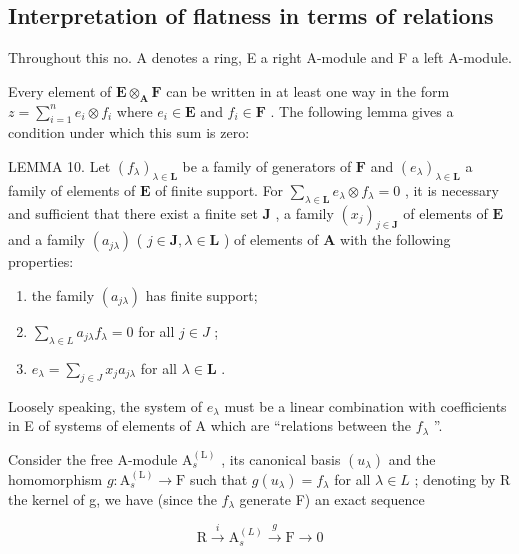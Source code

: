 \subsection{Interpretation of flatness in terms of relations}

Throughout this no. A denotes a ring, E a right A-module and F a left A-module.

Every element of \(\mathbf{E} \otimes_{\mathbf{A}} \mathbf{F}\) can be written in at least one way in the form \(z = \sum_{i=1}^{n} e_i \otimes f_i\) where \(e_i \in \mathbf{E}\) and \(f_i \in \mathbf{F}\) . The following lemma gives a condition under which this sum is zero:

LEMMA 10. Let \((f_{\lambda})_{\lambda \in \mathbf{L}}\) be a family of generators of \(\mathbf{F}\) and \((e_{\lambda})_{\lambda \in \mathbf{L}}\) a family of elements of \(\mathbf{E}\) of finite support. For \(\sum_{\lambda \in \mathbf{L}} e_{\lambda} \otimes f_{\lambda} = 0\) , it is necessary and sufficient that there exist a finite set \(\mathbf{J}\) , a family \((x_{j})_{j \in \mathbf{J}}\) of elements of \(\mathbf{E}\) and a family \((a_{j\lambda})\) ( \(j \in \mathbf{J}, \lambda \in \mathbf{L}\) ) of elements of \(\mathbf{A}\) with the following properties:

\begin{enumerate}
\def\labelenumi{(\arabic{enumi})}
\item
  the family \((a_{j\lambda})\) has finite support;
\item
  \(\sum_{\lambda \in L} a_{j\lambda} f_{\lambda} = 0\) for all \(j \in J\) ;
\item
  \(e_{\lambda} = \sum_{j\in J}x_ja_{j\lambda}\) for all \(\lambda \in \mathbf{L}\) .
\end{enumerate}

Loosely speaking, the system of \(e_{\lambda}\) must be a linear combination with coefficients in E of systems of elements of A which are ``relations between the \(f_{\lambda}\) ''.

Consider the free A-module \(\mathrm{A}_{s}^{(\mathrm{L})}\) , its canonical basis \((u_{\lambda})\) and the homomorphism \(g: \mathrm{A}_{s}^{(\mathrm{L})} \to \mathrm{F}\) such that \(g(u_{\lambda}) = f_{\lambda}\) for all \(\lambda \in L\) ; denoting by R the kernel of g, we have (since the \(f_{\lambda}\) generate F) an exact sequence

\[
\mathrm{R} \xrightarrow {i} \mathrm{A} _ {s} ^ {(L)} \xrightarrow {g} \mathrm{F} \longrightarrow 0
\]

